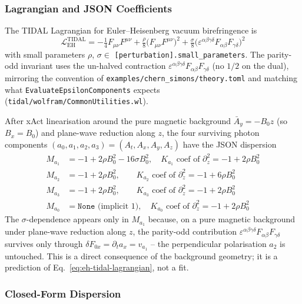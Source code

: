 \subsubsection{Lagrangian and JSON Coefficients}
\label{sec:pr-eh-lagrangian}

The TIDAL Lagrangian for Euler--Heisenberg vacuum birefringence is
\begin{equation}
  \mathcal{L}_{\mathrm{EH}}^{\mathrm{TIDAL}}
  = -\tfrac14 F_{\mu\nu}F^{\mu\nu}
  + \tfrac{\rho}{8}\big(F_{\mu\nu}F^{\mu\nu}\big)^2
  + \tfrac{\sigma}{8}\big(\varepsilon^{\alpha\beta\gamma\delta}F_{\alpha\beta}F_{\gamma\delta}\big)^2
  \label{eq:eh-tidal-lagrangian}
\end{equation}
with small parameters $\rho$, $\sigma \in$ \texttt{[perturbation].small\_parameters}. The parity-odd invariant uses the un-halved contraction $\varepsilon^{\alpha\beta\gamma\delta}F_{\alpha\beta}F_{\gamma\delta}$ (no $1/2$ on the dual), mirroring the convention of \texttt{examples/chern\_simons/theory.toml} and matching what \texttt{EvaluateEpsilonComponents} expects (\texttt{tidal/wolfram/CommonUtilities.wl}).

After xAct linearisation around the pure magnetic background $\bar{A}_y = -B_0 z$ (so $B_x = B_0$) and plane-wave reduction along $z$, the four surviving photon components $(a_0, a_1, a_2, a_3) = (A_t, A_x, A_y, A_z)$ have the JSON dispersion
\begin{align}
  M_{a_1} &= -1 + 2\rho B_0^2 - 16\sigma B_0^2, \quad K_{a_1}\text{ coef of }\partial_z^2 = -1 + 2\rho B_0^2 \\
  M_{a_2} &= -1 + 2\rho B_0^2, \qquad K_{a_2}\text{ coef of }\partial_z^2 = -1 + 6\rho B_0^2 \\
  M_{a_3} &= -1 + 2\rho B_0^2, \qquad K_{a_3}\text{ coef of }\partial_z^2 = -1 + 2\rho B_0^2 \\
  M_{a_0} &= \mathtt{None} \text{ (implicit }1\text{)}, \quad K_{a_0}\text{ coef of }\partial_z^2 = -1 + 2\rho B_0^2
\end{align}
The $\sigma$-dependence appears only in $M_{a_1}$ because, on a pure magnetic background under plane-wave reduction along $z$, the parity-odd contribution $\varepsilon^{\alpha\beta\gamma\delta}F_{\alpha\beta}F_{\gamma\delta}$ survives only through $\delta F_{0x} = \partial_t a_x = v_{a_1}$ -- the perpendicular polarisation $a_2$ is untouched. This is a direct consequence of the background geometry; it is a prediction of Eq.~\eqref{eq:eh-tidal-lagrangian}, not a fit.

\subsubsection{Closed-Form Dispersion}
\label{sec:pr-eh-dispersion}


